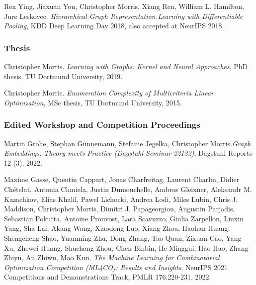 \documentclass[11pt, a4paper, DIV=14, headings=small]{scrartcl}
\begin{document}
\begin{thebibliography}{15}
		Rex Ying, Jiaxuan You, Christopher Morris, Xiang Ren, William L. Hamilton, Jure Leskovec.
		\emph{Hierarchical Graph Representation Learning with Differentiable Pooling},
		KDD Deep Learning Day 2018, also accepted at NeurIPS 2018.
		
		\subsubsection*{Thesis}
		
		Christopher Morris.
		\emph{Learning with Graphs: Kernel and Neural Approaches}, PhD thesis, TU Dortmund University, 2019.
		
		Christopher Morris.
		\emph{Enumeration Complexity of Multicriteria Linear Optimization}, MSc thesis, TU Dortmund University, 2015.
		
		\subsubsection*{Edited Workshop and Competition Proceedings}
		
		Martin Grohe, Stephan Günnemann, Stefanie Jegelka, Christopher Morris.\footnotemark[2]
		\emph{Graph Embeddings: Theory meets Practice (Dagstuhl Seminar 22132)},
		Dagstuhl Reports 12 (3), 2022.
		
		Maxime Gasse, Quentin Cappart, Jonas Charfreitag, Laurent Charlin, Didier Chételat, Antonia Chmiela, Justin Dumouchelle, Ambros Gleixner, Aleksandr M. Kazachkov, Elias Khalil, Pawel Lichocki, Andrea Lodi, Miles Lubin, Chris J. Maddison, Christopher Morris, Dimitri J. Papageorgiou, Augustin Parjadis, Sebastian Pokutta, Antoine Prouvost, Lara Scavuzzo, Giulia Zarpellon, Linxin Yang, Sha Lai, Akang Wang, Xiaodong Luo, Xiang Zhou, Haohan Huang, Shengcheng Shao, Yuanming Zhu, Dong Zhang, Tao Quan, Zixuan Cao, Yang Xu, Zhewei Huang, Shuchang Zhou, Chen Binbin, He Minggui, Hao Hao, Zhang Zhiyu, An Zhiwu, Mao Kun.
		\emph{The Machine Learning for Combinatorial Optimization Competition (ML4CO): Results and Insights}, NeurIPS 2021 Competitions and Demonstrations Track, PMLR 176:220-231, 2022.
		
		

	\end{thebibliography}
	
\end{document}
